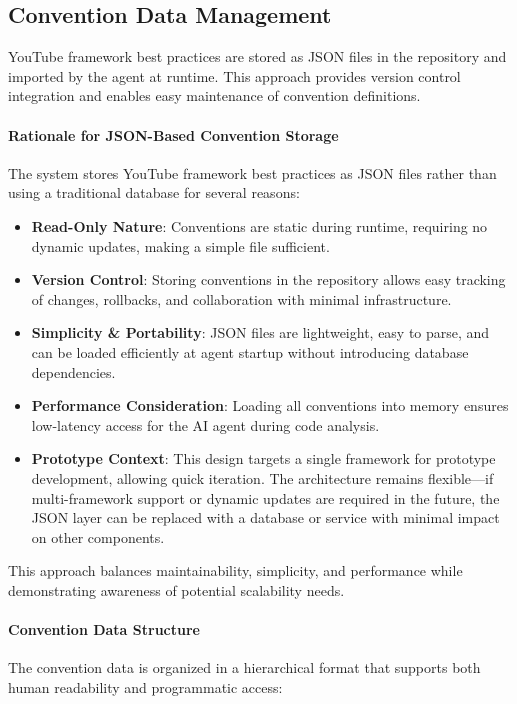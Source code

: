 \begin{spacing}{1.2}
\subsection{Convention Data Management}
YouTube framework best practices are stored as JSON files in the repository and imported by the agent at runtime. This approach provides version control integration and enables easy maintenance of convention definitions.

\paragraph{Rationale for JSON-Based Convention Storage}
The system stores YouTube framework best practices as JSON files rather than using a traditional database for several reasons:
\begin{itemize}
    \item \textbf{Read-Only Nature}: Conventions are static during runtime, requiring no dynamic updates, making a simple file sufficient.
    \item \textbf{Version Control}: Storing conventions in the repository allows easy tracking of changes, rollbacks, and collaboration with minimal infrastructure.
    \item \textbf{Simplicity \& Portability}: JSON files are lightweight, easy to parse, and can be loaded efficiently at agent startup without introducing database dependencies.
    \item \textbf{Performance Consideration}: Loading all conventions into memory ensures low-latency access for the AI agent during code analysis.
    \item \textbf{Prototype Context}: This design targets a single framework for prototype development, allowing quick iteration. The architecture remains flexible—if multi-framework support or dynamic updates are required in the future, the JSON layer can be replaced with a database or service with minimal impact on other components.
\end{itemize}
This approach balances maintainability, simplicity, and performance while demonstrating awareness of potential scalability needs.

\paragraph{Convention Data Structure}
The convention data is organized in a hierarchical format that supports both human readability and programmatic access:


\end{spacing}
